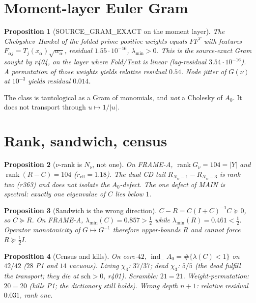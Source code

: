 \documentclass[11pt]{article}
\newtheorem{prop}{Proposition}
\theoremstyle{remark}
\newcommand{\indm}{\operatorname{ind}_{-}}
\newcommand{\half}{\tfrac12}
\begin{document}
\section{Moment-layer Euler Gram}\label{sec:euler}

\begin{prop}[SOURCE\_GRAM\_EXACT on the moment layer]
\label{prop:euler}
The Chebyshev--Hankel of the folded prime-positive weights
equals $FF^T$ with features $F_{\alpha j}=T_j(x_\alpha)\sqrt{w_\alpha}$,
residual $1.55\cdot 10^{-16}$, $\lambda_{\min}>0$.
This is the source-exact Gram sought by r404, on the layer
where Fold/Tent is linear (lag-residual $3.54\cdot 10^{-16}$).
A permutation of those weights yields relative residual $0.54$.
Node jitter of $G(\nu)$ at $10^{-3}$ yields residual $0.014$.
\end{prop}

The class is tautological as a Gram of monomials, and
\emph{not} a Cholesky of $A_0$.
It does not transport through $u\mapsto 1/|u|$.

\section{Rank, sandwich, census}\label{sec:rank}

\begin{prop}[$\nu$-rank is $N_\nu$, not one]\label{prop:rank}
On FRAME-A, $\operatorname{rank} G_\nu=104=|Y|$ and
$\operatorname{rank}(R-C)=104$ ($r_{\mathrm{eff}}=1.18$).
The dual CD tail $R_{N_w-1}-R_{N_w-3}$ is rank two (r363)
and does not isolate the $A_0$-defect.
The one defect of MAIN is spectral:
exactly one eigenvalue of $C$ lies below $1$.
\end{prop}

\begin{prop}[Sandwich is the wrong direction]\label{prop:sand}
$C-R=C(I+C)^{-1}C\succeq 0$, so $C\succeq R$.
On FRAME-A, $\lambda_{\min}(C)=0.857>\half$ while
$\lambda_{\min}(R)=0.461<\half$.
Operator monotonicity of $G\mapsto G^{-1}$ therefore
upper-bounds $R$ and cannot force $R\succeq\half I$.
\end{prop}

\begin{prop}[Census and kills]\label{prop:census}
On core-$42$, $\indm A_0=\#\{\lambda(C)<1\}$ on $42/42$
($28$ P1 and $14$ vacuous).
Living $\chi_3$: $37/37$; dead $\chi_3$: $5/5$ (the dead
fulfill the transport; they die at $\mathrm{sch}>0$, r401).
Scramble: $21=21$.
Weight-permutation: $20=20$ (kills P1; the dictionary still
holds).
Wrong depth $n+1$: relative residual $0.031$, rank one.
\end{prop}
\end{document}
